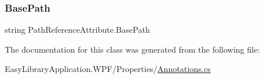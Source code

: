 \subsubsection{\texorpdfstring{Base\+Path}{BasePath}}
{\footnotesize\ttfamily string Path\+Reference\+Attribute.\+Base\+Path\hspace{0.3cm}{\ttfamily [get]}}



The documentation for this class was generated from the following file\+:\begin{DoxyCompactItemize}
\item 
Easy\+Library\+Application.\+W\+P\+F/\+Properties/\mbox{\hyperlink{_annotations_8cs}{Annotations.\+cs}}\end{DoxyCompactItemize}
